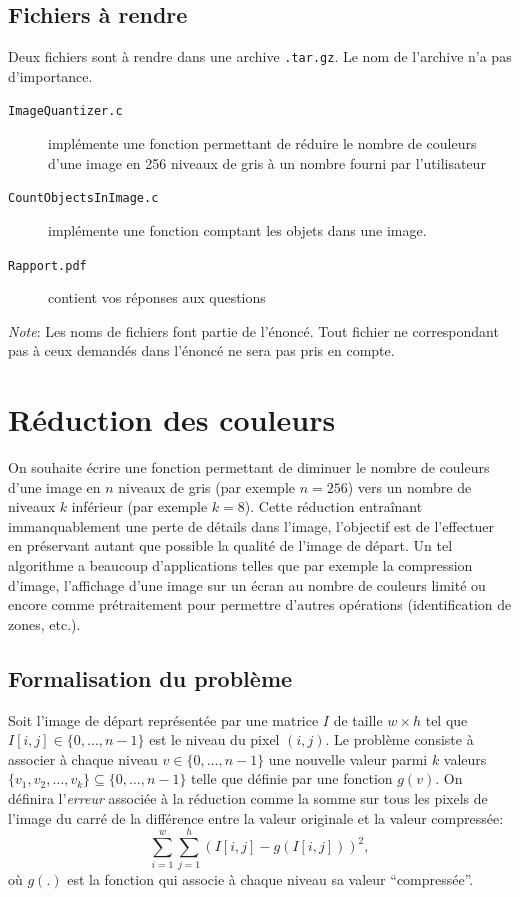 \documentclass[a4paper,10pt]{article}
\begin{document}
\subsection*{Fichiers à rendre}

Deux fichiers sont à rendre dans une archive \texttt{.tar.gz}. Le nom de l'archive n'a pas d'importance.
\begin{description}
\item[\texttt{ImageQuantizer.c}] implémente une fonction permettant de réduire le nombre de couleurs d'une image en 256 niveaux de gris à un nombre fourni par l'utilisateur
\item[\texttt{CountObjectsInImage.c}] implémente une fonction comptant les objets dans une image.
\item[\texttt{Rapport.pdf}] contient vos réponses aux questions
\end{description}

{\em Note}: Les noms de fichiers font partie de l'énoncé. Tout fichier ne
correspondant pas à ceux demandés dans l'énoncé ne sera pas pris en compte.

\section{Réduction des couleurs}

On souhaite écrire une fonction permettant de diminuer le nombre de
couleurs d'une image en $n$ niveaux de gris (par exemple $n=256$) vers
un nombre de niveaux $k$ inférieur (par exemple $k=8$). Cette
réduction entraînant immanquablement une perte de détails dans
l'image, l'objectif est de l'effectuer en préservant autant que
possible la qualité de l'image de départ. Un tel algorithme a beaucoup
d'applications telles que par exemple la compression d'image,
l'affichage d'une image sur un écran au nombre de couleurs limité ou
encore comme prétraitement pour permettre d'autres opérations
(identification de zones, etc.).

\subsection*{Formalisation du problème}

Soit l'image de départ représentée par une matrice $I$ de taille
$w\times h$ tel que $I[i,j]\in\{0,\ldots,n-1\}$ est le niveau du pixel
$(i,j)$. Le problème consiste à associer à chaque niveau $v\in
\{0,\ldots,n-1\}$ une nouvelle valeur parmi $k$ valeurs $\{v_1,
v_2,\ldots, v_k\} \subseteq \{0,\ldots, n-1\}$ telle que définie par une
fonction $g(v)$. On définira l'{\it erreur} associée à la réduction
comme la somme sur tous les pixels de l'image du carré de la
différence entre la valeur originale et la valeur compressée:
$$\sum_{i=1}^w\sum_{j=1}^h (I[i,j]-g(I[i,j]))^2,$$ où $g(.)$ est la
fonction qui associe à chaque niveau sa valeur ``compressée''.
\end{document}
